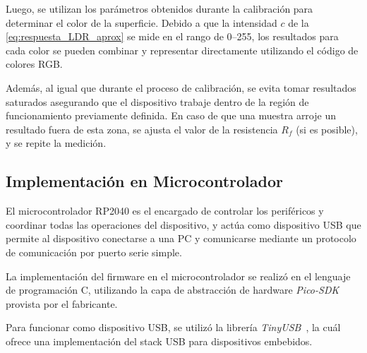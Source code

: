 \documentclass[12pt,a4paper,fleqn]{article}
\begin{document}
Luego, se utilizan los parámetros obtenidos durante la calibración para determinar el color de la superficie. Debido a que la intensidad $c$ de la \cref{eq:respuesta_LDR_aprox} se mide en el rango de \numrange{0}{255}, los resultados para cada color se pueden combinar y representar directamente utilizando el código de colores RGB.

Además, al igual que durante el proceso de calibración, se evita tomar resultados saturados asegurando que el dispositivo trabaje dentro de la región de funcionamiento previamente definida. En caso de que una muestra arroje un resultado fuera de esta zona, se ajusta el valor de la resistencia $R_f$ (si es posible), y se repite la medición.

\subsection{Implementación en Microcontrolador}

El microcontrolador RP2040 es el encargado de controlar los periféricos y coordinar todas las operaciones del dispositivo, y actúa como dispositivo USB que permite al dispositivo conectarse a una PC y comunicarse mediante un protocolo de comunicación por puerto serie simple.

La implementación del firmware en el microcontrolador se realizó en el lenguaje de programación C, utilizando la capa de abstracción de hardware \textit{Pico-SDK}~\cite{pico_sdk_doc} provista por el fabricante.

Para funcionar como dispositivo USB, se utilizó la librería \textit{TinyUSB}~\cite{tinyusb_doc}, la cuál ofrece una implementación del stack USB para dispositivos embebidos. 
\end{document}
